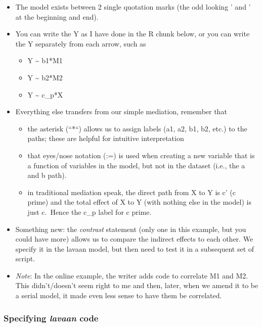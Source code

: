 \documentclass[
  11pt,
]{book}
\providecommand{\tightlist}{%
  \setlength{\itemsep}{0pt}\setlength{\parskip}{0pt}}
\begin{document}
\begin{itemize}
\item
  The model exists between 2 single quotation marks (the odd looking ' and ' at the beginning and end).
\item
  You can write the Y as I have done in the R chunk below, or you can write the Y separately from each arrow, such as

  \begin{itemize}
  \tightlist
  \item
    Y \textasciitilde{} b1*M1
  \item
    Y \textasciitilde{} b2*M2
  \item
    Y \textasciitilde{} c\_p*X
  \end{itemize}
\item
  Everything else transfers from our simple mediation, remember that

  \begin{itemize}
  \tightlist
  \item
    the asterisk (``*``) allows us to assign labels (a1, a2, b1, b2, etc.) to the paths; these are helpful for intuitive interpretation
  \item
    that eyes/nose notation (:=) is used when creating a new variable that is a function of variables in the model, but not in the dataset (i.e., the a and b path).
  \item
    in traditional mediation speak, the direct path from X to Y is c' (c prime) and the total effect of X to Y (with nothing else in the model) is just c.~Hence the c\_p label for c prime.
  \end{itemize}
\item
  Something new: the \emph{contrast} statement (only one in this example, but you could have more) allows us to compare the indirect effects to each other. We specify it in the lavaan model, but then need to test it in a subsequent set of script.
\item
  \emph{Note}: In the online example, the writer adds code to correlate M1 and M2. This didn't/doesn't seem right to me and then, later, when we amend it to be a serial model, it made even less sense to have them be correlated.
\end{itemize}

\hypertarget{specifying-lavaan-code}{%
\subsubsection{\texorpdfstring{Specifying \emph{lavaan} code}{Specifying lavaan code}}\label{specifying-lavaan-code}}
\end{document}
